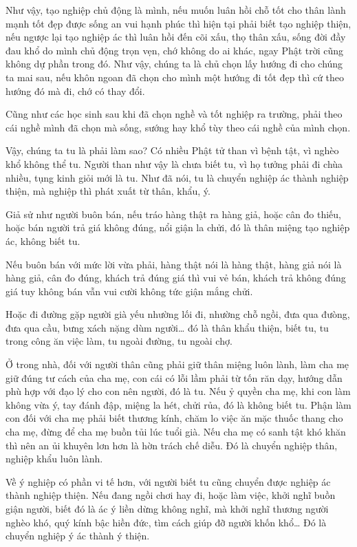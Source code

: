 \documentclass[
  12pt,
  oneside]{book}
\begin{document}
Như vậy, tạo nghiệp chủ động là mình, nếu muốn luân hồi chỗ tốt cho thân lành mạnh tốt đẹp được sống an vui hạnh phúc thì hiện tại phải biết tạo nghiệp thiện, nếu ngược lại tạo nghiệp ác thì luân hồi đến cõi xấu, thọ thân xấu, sống đời đầy đau khổ do mình chủ động trọn vẹn, chớ không do ai khác, ngay Phật trời cũng không dự phần trong đó. Như vậy, chúng ta là chủ chọn lấy hướng đi cho chúng ta mai sau, nếu khôn ngoan đã chọn cho mình một hướng đi tốt đẹp thì cứ theo hướng đó mà đi, chớ có thay đổi.

Cũng như các học sinh sau khi đã chọn nghề và tốt nghiệp ra trường, phải theo cái nghề mình đã chọn mà sống, sướng hay khổ tùy theo cái nghề của mình chọn.

Vậy, chúng ta tu là phải làm sao? Có nhiều Phật tử than vì bệnh tật, vì nghèo khổ không thể tu. Người than như vậy là chưa biết tu, vì họ tưởng phải đi chùa nhiều, tụng kinh giỏi mới là tu. Như đã nói, tu là chuyển nghiệp ác thành nghiệp thiện, mà nghiệp thì phát xuất từ thân, khẩu, ý.

Giả sử như người buôn bán, nếu tráo hàng thật ra hàng giả, hoặc cân đo thiếu, hoặc bán người trả giá không đúng, nổi giận la chửi, đó là thân miệng tạo nghiệp ác, không biết tu.

Nếu buôn bán với mức lời vừa phải, hàng thật nói là hàng thật, hàng giả nói là hàng giả, cân đo đúng, khách trả đúng giá thì vui vẻ bán, khách trả không đúng giá tuy không bán vẫn vui cười không tức giận mắng chửi.

Hoặc đi đường gặp người già yếu nhường lối đi, nhường chỗ ngồi, đưa qua đưòng, đưa qua cầu, bưng xách nặng dùm người\ldots{} đó là thân khẩu thiện, biết tu, tu trong công ăn việc làm, tu ngoài đường, tu ngoài chợ.

Ở trong nhà, đối với người thân cũng phải giữ thân miệng luôn lành, làm cha mẹ giữ đúng tư cách của cha mẹ, con cái có lỗi lầm phải từ tốn răn dạy, hướng dẫn phù hợp với đạo lý cho con nên người, đó là tu. Nếu ỷ quyền cha mẹ, khi con làm không vừa ý, tay đánh đập, miệng la hét, chửi rủa, đó là không biết tu. Phận làm con đối với cha mẹ phải biết thương kính, chăm lo việc ăn mặc thuốc thang cho cha mẹ, đừng để cha mẹ buồn tủi lúc tuổi già. Nếu cha mẹ có sanh tật khó khăn thì nên an ủi khuyên lơn hơn là hờn trách chế diễu. Đó là chuyển nghiệp thân, nghiệp khẩu luôn lành.

Về ý nghiệp có phần vi tế hơn, với người biết tu cũng chuyển được nghiệp ác thành nghiệp thiện. Nếu đang ngồi chơi hay đi, hoặc làm việc, khởi nghĩ buồn giận người, biết đó là ác ý liền dừng không nghĩ, mà khởi nghĩ thương người nghèo khó, quý kính bậc hiền đức, tìm cách giúp đỡ người khốn khổ\ldots{} Đó là chuyển nghiệp ý ác thành ý thiện.
\end{document}
